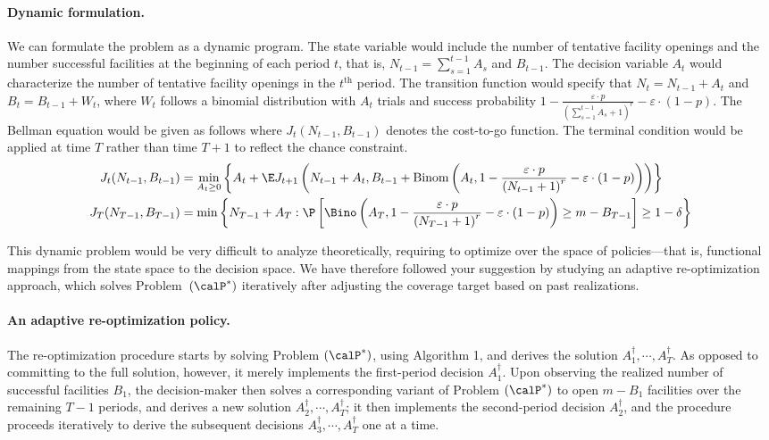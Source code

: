 \documentclass[11pt]{article}
\begin{document}
\paragraph{Dynamic formulation.}
We can formulate the problem as a dynamic program. The state variable would include the number of tentative facility openings and the number successful facilities at the beginning of each period $t$, that is, $N_{t-1}=\sum_{s=1}^{t-1}A_s$ and $B_{t-1}$. The decision variable $A_t$ would characterize the number of tentative facility openings in the $t^{\text{th}}$ period. The transition function would specify that $N_t=N_{t-1}+A_t$ and $B_t=B_{t-1}+W_t$, where $W_t$ follows a binomial distribution with $A_t$ trials and success probability $1- \frac{\varepsilon\cdot p}{\left(\sum_{s=1}^{t-1} A_s +1\right)^r}-\varepsilon\cdot(1-p)$. The Bellman equation would be given as follows where $J_t(N_{t-1},B_{t-1})$ denotes the cost-to-go function. The terminal condition would be applied at time $T$ rather than time $T+1$ to reflect the chance constraint.
\begin{align*}
    J_t(N_{t-1},B_{t-1})&=\min_{A_t\geq0}\left\{A_t+\E J_{t+1}\left(N_{t-1}+A_t,B_{t-1}+\text{Binom}\left(A_t,1- \frac{\varepsilon\cdot p}{\left(N_{t-1} +1\right)^r}-\varepsilon\cdot(1-p)\right)\right)\right\}\\
    J_T(N_{T-1},B_{T-1})&=\min\left\{N_{T-1}+A_T:\P\left[\Bino\left(A_T, 1- \frac{\varepsilon\cdot p}{\left(N_{T-1} +1\right)^r}-\varepsilon\cdot(1-p)\right)\geq m-B_{T-1}\right]\geq1-\delta\right\}
\end{align*}

This dynamic problem would be very difficult to analyze theoretically, requiring to optimize over the space of policies---that is, functional mappings from the state space to the decision space. We have therefore followed your suggestion by studying an adaptive re-optimization approach, which solves Problem~$(\calP^*)$ iteratively after adjusting the coverage target based on past realizations.

\paragraph{An adaptive re-optimization policy.}
The re-optimization procedure starts by solving Problem $(\calP^*)$, using Algorithm 1, and derives the solution $A^\dagger_1,\cdots,A^\dagger_T$. As opposed to committing to the full solution, however, it merely implements the first-period decision $A^\dagger_1$. Upon observing the realized number of successful facilities $B_1$, the decision-maker then solves a corresponding variant of Problem $(\calP^*)$ to open $m-B_1$ facilities over the remaining $T-1$ periods, and derives a new solution $A^\dagger_2,\cdots,A^\dagger_T$; it then implements the second-period decision $A^\dagger_2$, and the procedure proceeds iteratively to derive the subsequent decisions $A^\dagger_3,\cdots,A^\dagger_T$ one at a time.
\end{document}
